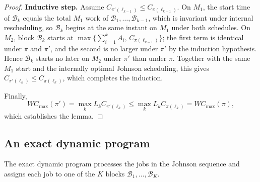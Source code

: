 \documentclass[12pt]{article}
\begin{document}
\begin{sloppypar}
\begin{proof}
            \textbf{Inductive step.}
            Assume $C_{\pi'(\ell_{k-1})} \le C_{\pi(\ell_{k-1})}$. On $M_1$, the start time of $\mathcal{B}_k$
            equals the
            total $M_1$ work of $\mathcal{B}_1,\dots,\mathcal{B}_{k-1}$, which is invariant under internal
            rescheduling, so $\mathcal{B}_k$ begins at the same instant on $M_1$ under both schedules. On $M_2$,
            block $\mathcal{B}_k$ starts at $\max\{\sum_{i=1}^{k}A_{i},\,C_{\pi(\ell_{k-1})}\}$; the first term is
            identical
            under $\pi$ and $\pi'$, and the second is no larger under $\pi'$ by the induction hypothesis. Hence
            $\mathcal{B}_k$ starts no later on $M_2$ under $\pi'$ than under $\pi$. Together with the same $M_1$
            start and the internally optimal Johnson scheduling, this gives
            $C_{\pi'(\ell_k)} \le C_{\pi(\ell_k)}$, which
            completes the induction.
            
            Finally,
            \[
            W C_{\max}(\pi') = \max_{k} L_k C_{\pi'(\ell_k)}
            \le \max_{k} L_k C_{\pi(\ell_k)} = W C_{\max}(\pi),
            \]
            which establishes the lemma.
        \end{proof}
        
        \subsection{An exact dynamic program}
        The exact dynamic program processes the jobs in the Johnson sequence and assigns each job to one
        of the $K$ blocks $\mathcal{B}_1,\dots,\mathcal{B}_K$.
        

\end{sloppypar}
\end{document}
